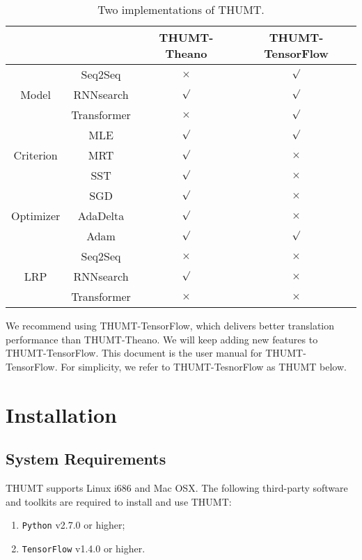\documentclass{article}
\begin{document}
\begin{table}[!t]
\centering
\begin{tabular}{|c|c|c|c|}
\cline{3-4}
\multicolumn{2}{c|}{} & THUMT-Theano & THUMT-TensorFlow \\
\hline
 & Seq2Seq &  $\times$ & $\surd$ \\
Model           & RNNsearch & $\surd$ & $\surd$ \\
           & Transformer & $\times$ & $\surd$ \\
\hline
 & MLE & $\surd$ & $\surd$ \\

Criterion               & MRT & $\surd$ & $\times$ \\
               & SST & $\surd$ & $\times$ \\
\hline
 & SGD & $\surd$ & $\times$ \\
Optimizer & AdaDelta & $\surd$ & $\times$ \\
 & Adam & $\surd$ & $\surd$ \\
\hline
  & Seq2Seq & $\times$ & $\times$ \\
LRP        & RNNsearch & $\surd$ & $\times$ \\
        & Transformer & $\times$ & $\times$ \\
\hline
\end{tabular}
\caption{Two implementations of THUMT.} \label{table:1:implementation}
\end{table}

We recommend using THUMT-TensorFlow, which delivers better translation performance than THUMT-Theano. We will keep adding new features to THUMT-TensorFlow. This document is the user manual for THUMT-TensorFlow. For simplicity, we refer to THUMT-TesnorFlow as THUMT below.


\section{Installation}

\subsection{System Requirements}
THUMT supports Linux i686 and Mac OSX. The following third-party software and toolkits are required to install and use THUMT:
\begin{enumerate}
\item \verb|Python| v2.7.0 or higher;
\item \verb|TensorFlow| v1.4.0 or higher.
\end{enumerate}
\end{document}
